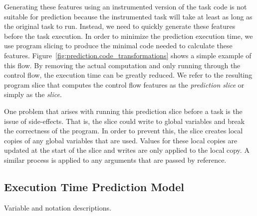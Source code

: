 Generating these features using an instrumented version of the task code is not
suitable for prediction because the instrumented task will take at least as long
as the original task to run. Instead, we need to quickly generate these features before
the task execution. In order to minimize the prediction execution time, we use
program slicing to produce the minimal code needed to calculate these features.
Figure~\ref{fig:prediction.code_transformations} shows a simple example of this
flow. By removing the actual computation and only running through the control
flow, the execution time can be greatly reduced. We refer to the resulting
program slice that computes the control flow
features as the \emph{prediction slice} or simply as the \emph{slice}.

One problem that arises with running this prediction slice before a task is the
issue of side-effects. That is, the slice could write to global variables and
break the correctness of the program. In order to prevent this, the slice
creates local copies of any global variables that are used. Values for these
local copies are updated at the start of the slice and writes are only applied
to the local copy. A similar process is applied to any arguments that are
passed by reference.

\subsection{Execution Time Prediction Model}
\label{sec:prediction.model}

\begin{table}[tb]
  \begin{center}
    \begin{small}
    
    \end{small}
    \caption{Variable and notation descriptions.}
    \label{tab:prediction.variables}
  \end{center}
\end{table}

